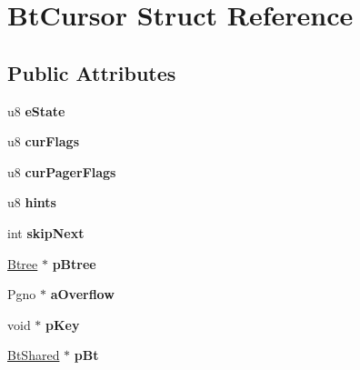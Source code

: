 \hypertarget{struct_bt_cursor}{}\section{Bt\+Cursor Struct Reference}
\label{struct_bt_cursor}
\subsection*{Public Attributes}
\begin{DoxyCompactItemize}
\item 
\mbox{\label{struct_bt_cursor_a30ab5e7109965b34a08562a7b7e6de15}} 
u8 {\bfseries e\+State}
\item 
\mbox{\label{struct_bt_cursor_ab120d81b3550eabce37f377cbdae8836}} 
u8 {\bfseries cur\+Flags}
\item 
\mbox{\label{struct_bt_cursor_aff2ef1cec10fbfc0c2d35277b5ee4432}} 
u8 {\bfseries cur\+Pager\+Flags}
\item 
\mbox{\label{struct_bt_cursor_ad8c66c31cf1a2c2181d61a64ca951a8a}} 
u8 {\bfseries hints}
\item 
\mbox{\label{struct_bt_cursor_ab1dfdbd6c9ec6cdb21cdb5deaa6d5ecb}} 
int {\bfseries skip\+Next}
\item 
\mbox{\label{struct_bt_cursor_a2ad810542eaf99c9919c585624bead6f}} 
\mbox{\hyperlink{struct_btree}{Btree}} $\ast$ {\bfseries p\+Btree}
\item 
\mbox{\label{struct_bt_cursor_ae2dbcc15e63d349774a7ad6caef4d096}} 
Pgno $\ast$ {\bfseries a\+Overflow}
\item 
\mbox{\label{struct_bt_cursor_a3c979824f27f63678d7a2b02311bc330}} 
void $\ast$ {\bfseries p\+Key}
\item 
\mbox{\label{struct_bt_cursor_a61c245712549192f7644e5ac23c00b74}} 
\mbox{\hyperlink{struct_bt_shared}{Bt\+Shared}} $\ast$ {\bfseries p\+Bt}
\item 
\mbox{\label{struct_bt_cursor_ad2f8fe3aa7d3fa3309692b3e8a8c2395}} 

\end{DoxyCompactItemize}
